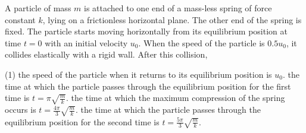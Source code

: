 
\item A particle of mass \( m \) is attached to one end of a mass-less spring of force constant \( k \), lying on a frictionless horizontal plane. The other end of the spring is fixed. The particle starts moving horizontally from its equilibrium position at time \( t = 0 \) with an initial velocity \( u_0 \). When the speed of the particle is \( 0.5 u_0 \), it collides elastically with a rigid wall. After this collision,
    \begin{tasks}(1)
        \task the speed of the particle when it returns to its equilibrium position is \( u_0 \).
        \task the time at which the particle passes through the equilibrium position for the first time is \( t = \pi \sqrt{\frac{m}{k}} \).
        \task the time at which the maximum compression of the spring occurs is \( t = \frac{4\pi}{3} \sqrt{\frac{m}{k}} \).
        \task the time at which the particle passes through the equilibrium position for the second time is \( t = \frac{5\pi}{3} \sqrt{\frac{m}{k}} \).
    \end{tasks}
